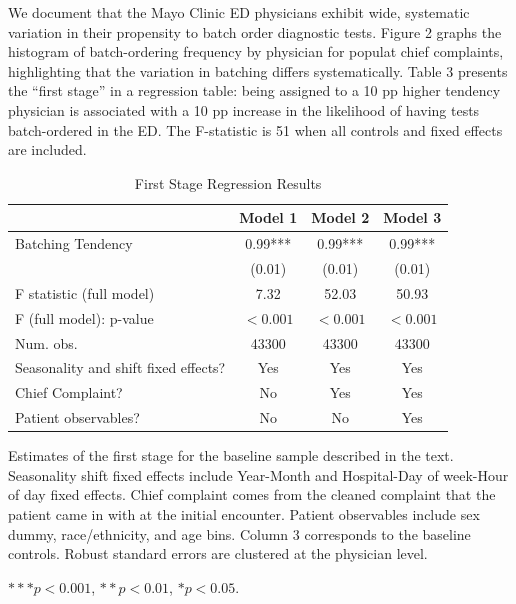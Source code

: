 \documentclass[,,nonblindrev]{informs}
\begin{document}
We document that the Mayo Clinic ED physicians exhibit wide, systematic
variation in their propensity to batch order diagnostic tests. Figure 2
graphs the histogram of batch-ordering frequency by physician for
populat chief complaints, highlighting that the variation in batching
differs systematically. Table 3 presents the ``first stage'' in a
regression table: being assigned to a 10 pp higher tendency physician is
associated with a 10 pp increase in the likelihood of having tests
batch-ordered in the ED. The F-statistic is 51 when all controls and
fixed effects are included.

\begin{table}[htbp]
\centering
\caption{First Stage Regression Results}
\begin{threeparttable}
\begin{tabularx}{0.85\textwidth}{@{}Xccc@{}}
\toprule
 & Model 1 & Model 2 & Model 3 \\
\midrule
Batching Tendency & 0.99*** & 0.99*** & 0.99*** \\
 & (0.01) & (0.01) & (0.01) \\
\midrule
F statistic (full model)&7.32&52.03&50.93\\  
F (full model): p-value& $<0.001$ & $<0.001$ & $<0.001$ \\
\midrule
Num. obs. & 43300 & 43300 & 43300 \\
Seasonality and shift fixed effects? & Yes & Yes & Yes \\
Chief Complaint? & No & Yes & Yes \\
Patient observables? & No & No & Yes \\
\bottomrule
\end{tabularx}
\begin{tablenotes}
\tiny
\item Estimates of the first stage for the baseline sample described in the text. Seasonality shift fixed effects include Year-Month and Hospital-Day of week-Hour of day fixed effects. Chief complaint comes from the cleaned complaint that the patient came in with at the initial encounter. Patient observables include sex dummy, race/ethnicity, and age bins. Column 3 corresponds to the baseline controls. Robust standard errors are clustered at the physician level.
\item $*** p < 0.001$, $** p < 0.01$, $* p < 0.05$.
\end{tablenotes}\tiny
\end{threeparttable}
\label{table:regression}
\end{table}
\end{document}
